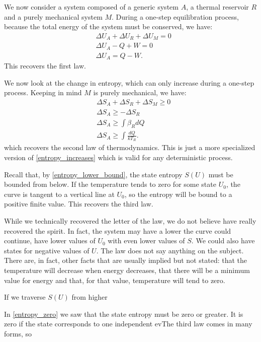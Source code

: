 \documentclass[letterpaper]{article}
\begin{document}
We now consider a system composed of a generic system $A$, a thermal reservoir $R$ and a purely mechanical system $M$. During a one-step equilibration process, because the total energy of the system must be conserved, we have:
\begin{equation}
\begin{aligned}
&\Delta U_A + \Delta U_R + \Delta U_M = 0 \\
&\Delta U_A - Q + W = 0 \\
&\Delta U_A = Q - W.
\end{aligned}
\end{equation}
This recovers the first law.

We now look at the change in entropy, which can only increase during a one-step process. Keeping in mind $M$ is purely mechanical, we have:
\begin{equation}
\begin{aligned}
&\Delta S_A + \Delta S_R + \Delta S_M \geq 0 \\
&\Delta S_A \geq - \Delta S_R \\
&\Delta S_A \geq \int \beta_R dQ \\
&\Delta S_A \geq \int \frac{dQ}{k T_R}.
\end{aligned}
\end{equation}
which recovers the second law of thermodynamics. This is just a more specialized version of \eqref{entropy_increases} which is valid for any deterministic process.

Recall that, by \eqref{entropy_lower_bound}, the state entropy $S(U)$ must be bounded from below.  If the temperature tends to zero for some state $U_0$, the curve is tangent to a vertical line at $U_0$, so the entropy will be bound to a positive finite value. This recovers the third law.

While we technically recovered the letter of the law, we do not believe have really recovered the spirit. In fact, the system may have a lower the curve could continue, have lower values of $U_0$ with even lower values of $S$. We could also have states for negative values of $U$. The law does not say anything on the subject. There are, in fact, other facts that are usually implied but not stated: that the temperature will decrease when energy decreases, that there will be a minimum value for energy and that, for that value, temperature will tend to zero.

If we traverse $S(U)$ from higher 

In \eqref{entropy_zero} we saw that the state entropy must be zero or greater. It is zero if the state corresponds to one independent evThe third law comes in many forms, so 
\end{document}
